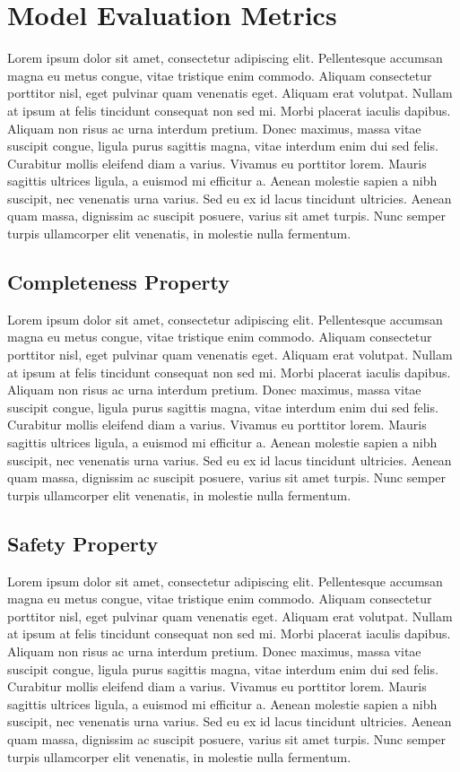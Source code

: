 \section{Model Evaluation Metrics}

Lorem ipsum dolor sit amet, consectetur adipiscing elit. Pellentesque accumsan magna eu metus congue, vitae tristique enim commodo. Aliquam consectetur porttitor nisl, eget pulvinar quam venenatis eget. Aliquam erat volutpat. Nullam at ipsum at felis tincidunt consequat non sed mi. Morbi placerat iaculis dapibus. Aliquam non risus ac urna interdum pretium. Donec maximus, massa vitae suscipit congue, ligula purus sagittis magna, vitae interdum enim dui sed felis. Curabitur mollis eleifend diam a varius. Vivamus eu porttitor lorem. Mauris sagittis ultrices ligula, a euismod mi efficitur a. Aenean molestie sapien a nibh suscipit, nec venenatis urna varius. Sed eu ex id lacus tincidunt ultricies. Aenean quam massa, dignissim ac suscipit posuere, varius sit amet turpis. Nunc semper turpis ullamcorper elit venenatis, in molestie nulla fermentum.

\subsection{Completeness Property}

Lorem ipsum dolor sit amet, consectetur adipiscing elit. Pellentesque accumsan magna eu metus congue, vitae tristique enim commodo. Aliquam consectetur porttitor nisl, eget pulvinar quam venenatis eget. Aliquam erat volutpat. Nullam at ipsum at felis tincidunt consequat non sed mi. Morbi placerat iaculis dapibus. Aliquam non risus ac urna interdum pretium. Donec maximus, massa vitae suscipit congue, ligula purus sagittis magna, vitae interdum enim dui sed felis. Curabitur mollis eleifend diam a varius. Vivamus eu porttitor lorem. Mauris sagittis ultrices ligula, a euismod mi efficitur a. Aenean molestie sapien a nibh suscipit, nec venenatis urna varius. Sed eu ex id lacus tincidunt ultricies. Aenean quam massa, dignissim ac suscipit posuere, varius sit amet turpis. Nunc semper turpis ullamcorper elit venenatis, in molestie nulla fermentum.

\subsection{Safety Property}

Lorem ipsum dolor sit amet, consectetur adipiscing elit. Pellentesque accumsan magna eu metus congue, vitae tristique enim commodo. Aliquam consectetur porttitor nisl, eget pulvinar quam venenatis eget. Aliquam erat volutpat. Nullam at ipsum at felis tincidunt consequat non sed mi. Morbi placerat iaculis dapibus. Aliquam non risus ac urna interdum pretium. Donec maximus, massa vitae suscipit congue, ligula purus sagittis magna, vitae interdum enim dui sed felis. Curabitur mollis eleifend diam a varius. Vivamus eu porttitor lorem. Mauris sagittis ultrices ligula, a euismod mi efficitur a. Aenean molestie sapien a nibh suscipit, nec venenatis urna varius. Sed eu ex id lacus tincidunt ultricies. Aenean quam massa, dignissim ac suscipit posuere, varius sit amet turpis. Nunc semper turpis ullamcorper elit venenatis, in molestie nulla fermentum.

